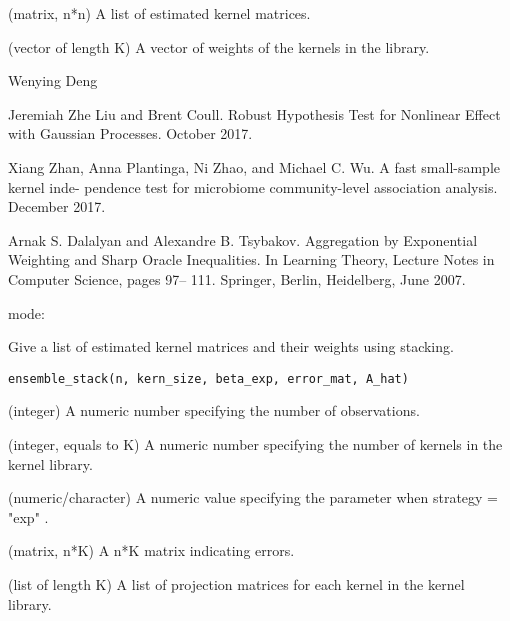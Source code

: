 \documentclass[a4paper]{book}
\begin{document}
%
\begin{Value}
\begin{ldescription}
\item[\code{A\_est}] (matrix, n*n) A list of estimated kernel matrices.

\item[\code{u\_hat}] (vector of length K) A vector of weights of the kernels in the
library.
\end{ldescription}
\end{Value}
%
\begin{Author}\relax
Wenying Deng
\end{Author}
%
\begin{References}\relax
Jeremiah Zhe Liu and Brent Coull. Robust Hypothesis Test for
Nonlinear Effect with Gaussian Processes. October 2017.

Xiang Zhan, Anna Plantinga, Ni Zhao, and Michael C. Wu. A fast small-sample
kernel inde- pendence test for microbiome community-level association
analysis. December 2017.

Arnak S. Dalalyan and Alexandre B. Tsybakov. Aggregation by Exponential
Weighting and Sharp Oracle Inequalities. In Learning Theory, Lecture Notes
in Computer Science, pages 97– 111. Springer, Berlin, Heidelberg, June 2007.
\end{References}
%
\begin{SeeAlso}\relax
mode: 
\end{SeeAlso}
%
\begin{Description}\relax
Give a list of estimated kernel matrices and their weights using stacking.
\end{Description}
%
\begin{Usage}
\begin{verbatim}
ensemble_stack(n, kern_size, beta_exp, error_mat, A_hat)
\end{verbatim}
\end{Usage}
%
\begin{Arguments}
\begin{ldescription}
\item[\code{n}] (integer) A numeric number specifying the number of observations.

\item[\code{kern\_size}] (integer, equals to K) A numeric number specifying the
number of kernels in the kernel library.

\item[\code{beta\_exp}] (numeric/character) A numeric value specifying the parameter
when strategy = "exp" .

\item[\code{error\_mat}] (matrix, n*K) A n\bsl{}*K matrix indicating errors.

\item[\code{A\_hat}] (list of length K) A list of projection matrices for each
kernel in the kernel library.
\end{ldescription}
\end{Arguments}
\end{document}
